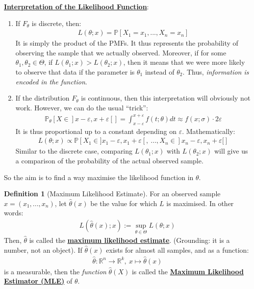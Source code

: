 \documentclass[11pt]{scrartcl}
\newcommand{\R}[0]{\mathbb{R}}
\theoremstyle{definition}
\newtheorem{definition}{Definition}
\theoremstyle{remark}
\newcommand{\dfn}[1]{\textbf{\underline{#1}}}
\newcommand{\pr}[1]{\mathbb{P}\left[#1 \right]}
\newcommand{\idx}[2]{\int_{#1}^{#2}}
\begin{document}
{\dfn{Interpretation of the Likelihood Function}: 
\begin{enumerate}[noitemsep]
	\item If $F_\theta$ is discrete, then: 
	\begin{align*}
		L(\theta; x) = \pr{X_1 = x_1, ..., X_n = x_n}	
	\end{align*}
	It is simply the product of the PMFs. It thus represents the probability of observing the sample that we actually observed. Moreover, if for some $\theta_1, \theta_2 \in \Theta$, if $L(\theta_1; x) > L(\theta_2; x)$, then it means that we were more likely to observe that data if the parameter is $\theta_1$ instead of $\theta_2$. Thus, \emph{information is encoded in the function}. 
	\item If the distribution $F_\theta$ is continuous, then this interpretation will obviously not work. However, we can do the usual ``trick'': 
	\begin{align*}
		\mathbb{P}_\theta [ X \in ]x - \varepsilon, x + \varepsilon [ ]  = \idx{x - \varepsilon}{x + \varepsilon} f (t; \theta) dt \approx f(x; \sigma) \cdot 2 \varepsilon	
	\end{align*}
	It is thus proportional up to a constant depending on $\varepsilon$. Mathematically: 
	\begin{align*}
		L(\theta; x) \propto \pr{X_1 \in ]x_1 - \varepsilon, x_1 + \varepsilon[,\ ..., X_n \in ]x_n - \varepsilon, x_n + \varepsilon [} 	
	\end{align*}
	Similar to the discrete case, comparing $L(\theta_1; x)$ with $L(\theta_2; x)$ will give us a comparison of the probability of the actual observed sample. 
\end{enumerate}
So the aim is to find a way maximise the likelihood function in $\theta$. 

\begin{definition}[Maximum Likelihood Estimate] 
	For an observed sample $x = (x_1, ..., x_n)$, let $\hat{\theta}(x)$ be the value for which $L$ is maximised. In other words: 
	\begin{align}
		L(\hat{\theta}(x); x) := \sup_{\theta \in \Theta} L(\theta; x) 
	\end{align}
	Then, $\hat{\theta}$ is called the \dfn{maximum likelihood estimate}. (Grounding: it is a number, not an object). If $\hat{\theta}(x)$ exists for almost all samples, and as a function: 
	\begin{align*}
		\hat{\theta}: \R^n \rightarrow \R^k,\ x \mapsto \hat{\theta}(x) 	
	\end{align*}
	is a measurable, then the \emph{function} $\hat{\theta}(X)$ is called the \dfn{Maximum Likelihood Estimator (MLE)} of $\theta$. 
\end{definition}

}
\end{document}

